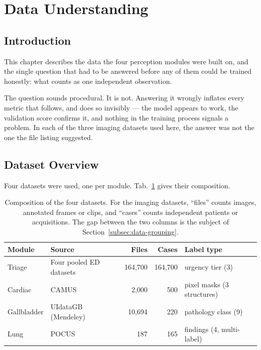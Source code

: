 %
\section{Data Understanding}
\label{sec:data}

\subsection{Introduction}

This chapter describes the data the four perception modules were built on, and the single
question that had to be answered before any of them could be trained honestly: what counts
as one independent observation.

The question sounds procedural. It is not. Answering it wrongly inflates every metric that
follows, and does so invisibly --- the model appears to work, the validation score confirms
it, and nothing in the training process signals a problem. In each of the three imaging
datasets used here, the answer was not the one the file listing suggested.

\subsection{Dataset Overview}
\label{subsec:data-overview}

Four datasets were used, one per module. Tab.~\ref{tab:datasets} gives their composition.

\begin{table}[H]
  \centering
  \small
  \setlength{\tabcolsep}{5pt}
  \begin{tabular}{llrrl}
    \toprule
    \textbf{Module} & \textbf{Source} & \textbf{Files} & \textbf{Cases} &
    \textbf{Label type} \\
    \midrule
    Triage      & Four pooled ED datasets            & 164{,}700 & 164{,}700 &
      urgency tier (3) \\
    Cardiac     & CAMUS \cite{leclerc2019camus}      & 2{,}000 & 500 &
      pixel masks (3 structures) \\
    Gallbladder & UIdataGB (Mendeley)                & 10{,}694 & 220 &
      pathology class (9) \\
    Lung        & POCUS \cite{born2021pocus}         & 187 & 165 &
      findings (4, multi-label) \\
    \bottomrule
  \end{tabular}
  \caption{Composition of the four datasets. For the imaging datasets, ``files'' counts
    images, annotated frames or clips, and ``cases'' counts independent patients or
    acquisitions. The gap between the two columns is the subject of
    Section~\ref{subsec:data-grouping}.}
  \label{tab:datasets}
\end{table}

